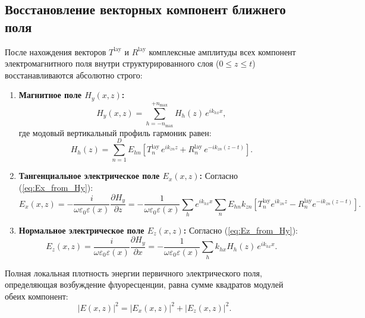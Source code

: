 \documentclass[a4paper,11pt]{article}
\begin{document}
\subsection{Восстановление векторных компонент ближнего поля}

После нахождения векторов $T^{\text{lay}}$ и $R^{\text{lay}}$ комплексные амплитуды всех компонент электромагнитного поля внутри структурированного слоя ($0 \le z \le t$) восстанавливаются абсолютно строго:

\begin{enumerate}
    \item \textbf{Магнитное поле $H_y(x, z)$:}
    \begin{equation}
        H_y(x, z) = \sum_{h=-n_{\max}}^{+n_{\max}} H_h(z) \, e^{i k_{hx} x},
    \end{equation}
    где модовый вертикальный профиль гармоник равен:
    \begin{equation}
        H_h(z) = \sum_{n=1}^D E_{hn} \left[ T_n^{\text{lay}} \, e^{i k_{zn} z} + R_n^{\text{lay}} \, e^{-i k_{zn}(z - t)} \right].
    \end{equation}

    \item \textbf{Тангенциальное электрическое поле $E_x(x, z)$:}
    Согласно (\ref{eq:Ex_from_Hy}):
    \begin{equation}
        E_x(x, z) = -\frac{i}{\omega \varepsilon_0 \varepsilon(x)} \frac{\partial H_y}{\partial z} = -\frac{1}{\omega \varepsilon_0 \varepsilon(x)} \sum_h e^{i k_{hx} x} \sum_n E_{hn} k_{zn} \left[ T_n^{\text{lay}} e^{i k_{zn} z} - R_n^{\text{lay}} e^{-i k_{zn}(z - t)} \right].
    \end{equation}

    \item \textbf{Нормальное электрическое поле $E_z(x, z)$:}
    Согласно (\ref{eq:Ez_from_Hy}):
    \begin{equation}
        E_z(x, z) = \frac{i}{\omega \varepsilon_0 \varepsilon(x)} \frac{\partial H_y}{\partial x} = -\frac{1}{\omega \varepsilon_0 \varepsilon(x)} \sum_h k_{hx} H_h(z) \, e^{i k_{hx} x}.
    \end{equation}
\end{enumerate}

Полная локальная плотность энергии первичного электрического поля, определяющая возбуждение флуоресценции, равна сумме квадратов модулей обеих компонент:
\begin{equation}
    |E(x, z)|^2 = |E_x(x, z)|^2 + |E_z(x, z)|^2.
    \label{eq:total_E_squared}
\end{equation}
\end{document}
